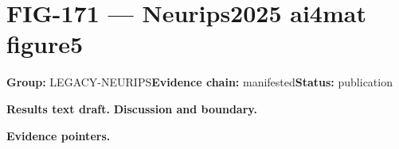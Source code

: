 \clearpage
\section{FIG-171 --- Neurips2025 ai4mat figure5}
\label{figpage:fig-171}
\textbf{Group:} LEGACY-NEURIPS\quad \textbf{Evidence chain:} manifested\quad \textbf{Status:} publication

\textbf{Results text draft.} 
\textbf{Discussion and boundary.} 


\textbf{Evidence pointers.}



\vfill
